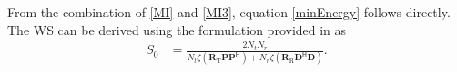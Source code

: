 \documentclass[twocolumn,10pt]{IEEEtran}
\renewcommand{\H}{{\scriptscriptstyle\mathsf{H}}}
\def\bD{{\mathbf{D}}}
\def\bP{{\mathbf{P}}}
\def\bR{{\mathbf{R}}}
\begin{document}
\begin{appendices}
		From the combination of \eqref{MI} and \eqref{MI3}, equation \eqref{minEnergy} follows directly.
		The WS can be derived using the formulation provided in \cite[eq. (19)]{Lozano2003} as
		\begin{align}
			S_{0}&=\frac{2 N_{t}N_{r}}{N_{t}\zeta(\bR_{\mathrm{T}}\bP\bP^{\H})+N_{r}\zeta(\bR_{\mathrm{R}}\bD^{\H}\bD)}.
		\end{align}
		
		
		
		
		
		
	\end{appendices}
	
	
	
	
	
	
	
\end{document}
